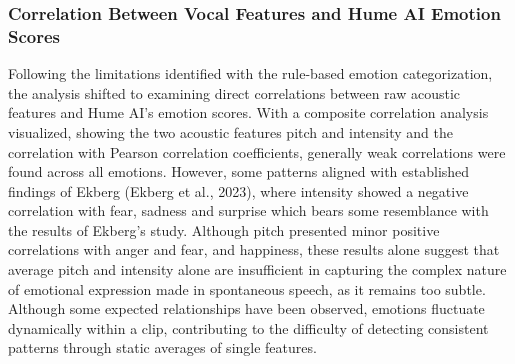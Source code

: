 \subsubsection{Correlation Between Vocal Features and Hume AI Emotion Scores}
Following the limitations identified with the rule-based emotion categorization, the analysis shifted to examining direct correlations between raw acoustic features and Hume AI’s emotion scores. 
With a composite correlation analysis visualized, showing the two acoustic features pitch and intensity and the correlation with Pearson correlation coeﬀicients, generally weak correlations were found across all emotions. 
However, some patterns aligned with established findings of Ekberg (Ekberg et al., 2023), where intensity showed a negative correlation with fear, sadness and surprise which bears some resemblance with the results of Ekberg’s study. Although pitch presented minor positive correlations with anger and fear, and happiness, these results alone suggest that average pitch and intensity alone are insufficient in capturing the complex nature of emotional expression made in spontaneous speech, as it remains too subtle. Although some expected relationships have been observed, emotions fluctuate dynamically within a clip, contributing to the difficulty of detecting consistent patterns through static averages of single features.

